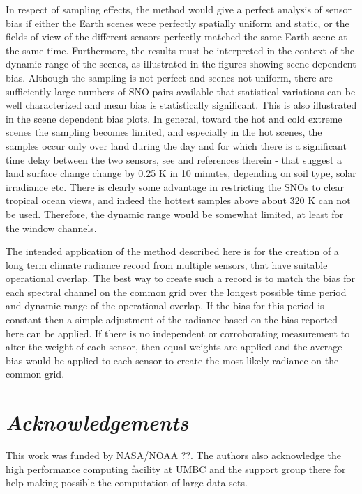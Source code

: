 \documentclass[twocolumn,10pt]{article}
\begin{document}
In respect of sampling effects, the method would give a perfect analysis of sensor bias if either the Earth scenes were perfectly spatially uniform and static, or the fields of view of the different sensors perfectly matched the same Earth scene at the same time. Furthermore, the results must be interpreted in the context of the dynamic range of the scenes, as illustrated in the figures showing scene dependent bias. Although the sampling is not perfect and scenes not uniform, there are sufficiently large numbers of SNO pairs available that statistical variations can be well characterized and mean bias is statistically significant. This is also illustrated in the scene dependent bias plots. In general, toward the hot and cold extreme scenes the sampling becomes limited, and especially in the hot scenes, the samples occur only over land during the day and for which there is a significant time delay between the two sensors, see \cite{Duan2014} and references therein - that suggest a land surface change change by 0.25 K in 10 minutes, depending on soil type, solar irradiance etc. There is clearly some advantage in restricting the SNOs to clear tropical ocean views, and indeed the hottest samples above about 320 K can not be used. Therefore, the dynamic range would be somewhat limited, at least for the window channels. 

The intended application of the method described here is for the creation of a long term climate radiance record from multiple sensors, that have suitable operational overlap. The best way to create such a record is to match the bias for each spectral channel on the common grid over the longest possible time period and dynamic range of the operational overlap. If the bias for this period is constant then a simple adjustment of the radiance based on the bias reported here can be applied. If there is no independent or corroborating measurement to alter the weight of each sensor, then equal weights are applied and the average bias would be applied to each sensor to create the most likely radiance on the common grid.

\section{\it Acknowledgements}
This work was funded by NASA/NOAA ??. The authors also acknowledge the high performance computing facility at UMBC and the support group there for help making possible the computation of large data sets.
\end{document}
